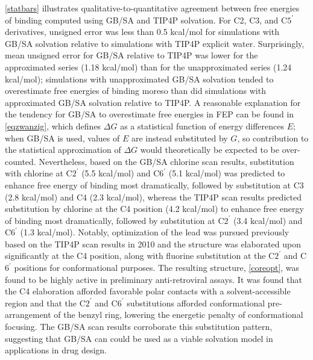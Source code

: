 \documentclass[12pt]{report}
\begin{document}
\cref{statbars} illustrates qualitative-to-quantitative agreement between free energies of binding computed using GB/SA and TIP4P solvation. For C2, C3, and C$5^\prime$ derivatives, unsigned error was less than 0.5 kcal/mol for simulations with GB/SA solvation relative to simulations with TIP4P explicit water. Surprisingly, mean unsigned error for GB/SA relative to TIP4P was lower for the approximated series (1.18 kcal/mol) than for the unapproximated series (1.24 kcal/mol); simulations with unapproximated GB/SA solvation tended to overestimate free energies of binding moreso than did simulations with approximated GB/SA solvation relative to TIP4P. A reasonable explanation for the tendency for GB/SA to overestimate free energies in FEP can be found in \cref{eqzwanzig}, which defines $\Delta G$ as a statistical function of energy differences $E$; when GB/SA is used, values of $E$ are instead substituted by $G$, so contribution to the statistical approximation of $\Delta G$ would theoretically be expected to be over-counted. Nevertheless, based on the GB/SA chlorine scan results, substitution with chlorine at C$2^\prime$ (5.5 kcal/mol) and C$6^\prime$ (5.1 kcal/mol) was predicted to enhance free energy of binding most dramatically, followed by substitution at C3 (2.8 kcal/mol) and C4 (2.3 kcal/mol), whereas the TIP4P scan results predicted substitution by chlorine at the C4 position (4.2 kcal/mol) to enhance free energy of binding most dramatically, followed by substitution at C$2^\prime$ (3.4 kcal/mol) and C$6^\prime$ (1.3 kcal/mol). Notably, optimization of the lead was pursued previously\cite{tipopt} based on the TIP4P scan results in 2010\cite{tipscan} and the structure was elaborated upon significantly at the C4 position, along with fluorine substitution at the C$2^\prime$ and C$6^\prime$ positions for conformational purposes. The resulting structure, \cref{coreopt}, was found to be highly active in preliminary anti-retroviral assays. It was found\cite{tipopt} that the C4 elaboration afforded favorable polar contacts with a solvent-accessible region and that the C$2^\prime$ and C$6^\prime$ substitutions afforded conformational pre-arrangement of the benzyl ring, lowering the energetic penalty of conformational focusing. The GB/SA scan results corroborate this substitution pattern, suggesting that GB/SA can could be used as a viable solvation model in applications in drug design.
\end{document}
